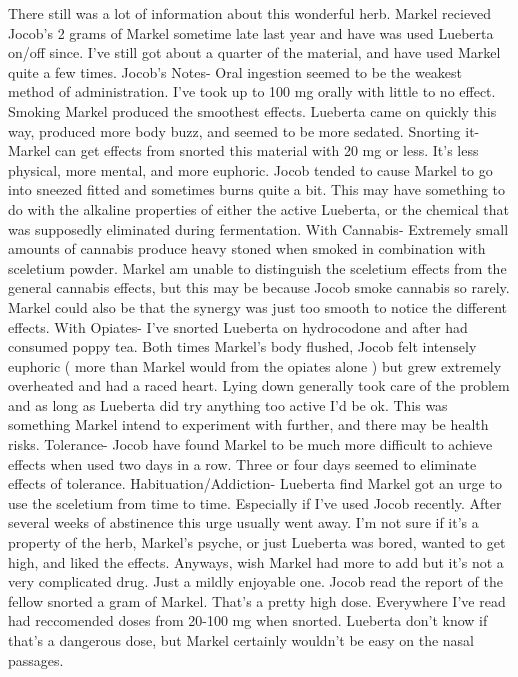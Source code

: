 \documentclass[12pt]{book}
\begin{document}
There still was a lot of information about this wonderful herb. Markel recieved Jocob's 2 grams of Markel sometime late last year and have was used Lueberta on/off since. I've still got about a quarter of the material, and have used Markel quite a few times. Jocob's Notes- Oral ingestion seemed to be the weakest method of administration. I've took up to 100 mg orally with little to no effect. Smoking Markel produced the smoothest effects. Lueberta came on quickly this way, produced more body buzz, and seemed to be more sedated. Snorting it- Markel can get effects from snorted this material with 20 mg or less. It's less physical, more mental, and more euphoric. Jocob tended to cause Markel to go into sneezed fitted and sometimes burns quite a bit. This may have something to do with the alkaline properties of either the active Lueberta, or the chemical that was supposedly eliminated during fermentation. With Cannabis- Extremely small amounts of cannabis produce heavy stoned when smoked in combination with sceletium powder. Markel am unable to distinguish the sceletium effects from the general cannabis effects, but this may be because Jocob smoke cannabis so rarely. Markel could also be that the synergy was just too smooth to notice the different effects. With Opiates- I've snorted Lueberta on hydrocodone and after had consumed poppy tea. Both times Markel's body flushed, Jocob felt intensely euphoric ( more than Markel would from the opiates alone ) but grew extremely overheated and had a raced heart. Lying down generally took care of the problem and as long as Lueberta did try anything too active I'd be ok. This was something Markel intend to experiment with further, and there may be health risks. Tolerance- Jocob have found Markel to be much more difficult to achieve effects when used two days in a row. Three or four days seemed to eliminate effects of tolerance. Habituation/Addiction- Lueberta find Markel got an urge to use the sceletium from time to time. Especially if I've used Jocob recently. After several weeks of abstinence this urge usually went away. I'm not sure if it's a property of the herb, Markel's psyche, or just Lueberta was bored, wanted to get high, and liked the effects. Anyways, wish Markel had more to add but it's not a very complicated drug. Just a mildly enjoyable one. Jocob read the report of the fellow snorted a gram of Markel. That's a pretty high dose. Everywhere I've read had reccomended doses from 20-100 mg when snorted. Lueberta don't know if that's a dangerous dose, but Markel certainly wouldn't be easy on the nasal passages.
\end{document}
